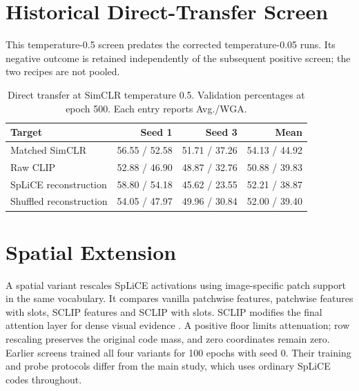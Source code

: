 \documentclass{article}
\begin{document}
\section{Historical Direct-Transfer Screen}
This temperature-0.5 screen predates the corrected temperature-0.05 runs.
Its negative outcome is retained independently of the subsequent positive
screen; the two recipes are not pooled.
\begin{table}[htbp]
\centering\small
\caption{Direct transfer at SimCLR temperature 0.5. Validation percentages
at epoch 500. Each entry reports Avg./WGA.}
\begin{tabular}{lrrr}
\toprule
Target & Seed 1 & Seed 3 & Mean \\
\midrule
Matched SimCLR & 56.55 / 52.58 & 51.71 / 37.26 & 54.13 / 44.92 \\
Raw CLIP & 52.88 / 46.90 & 48.87 / 32.76 & 50.88 / 39.83 \\
SpLiCE reconstruction & 58.80 / 54.18 & 45.62 / 23.55 & 52.21 / 38.87 \\
Shuffled reconstruction & 54.05 / 47.97 & 49.96 / 30.84 & 52.00 / 39.40 \\
\bottomrule
\end{tabular}
\label{tab:direct}
\end{table}

\section{Spatial Extension}
\label{sec:spatial}
A spatial variant rescales SpLiCE activations using image-specific patch
support in the same vocabulary. It compares vanilla patchwise features,
patchwise features with slots, SCLIP features and SCLIP with slots.
SCLIP modifies the final attention layer for dense visual evidence
\citep{wang2024sclip}. A positive floor limits attenuation; row rescaling
preserves the original code mass, and zero coordinates remain zero.
Earlier screens trained all four variants for 100 epochs with seed 0.
Their training and probe protocols differ from the main study, which uses
ordinary SpLiCE codes throughout.
\end{document}
